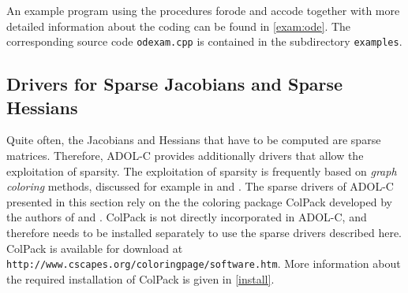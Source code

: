 \documentclass[11pt,twoside]{article}
\begin{document}
An example program using the procedures {\sf forode} and {\sf accode} together
with more detailed information about the coding can be found in
\autoref{exam:ode}. The corresponding source code 
\verb=odexam.cpp= is contained in the subdirectory
\verb=examples=.
%
%
\subsection{Drivers for Sparse Jacobians and Sparse Hessians}
\label{sparse}
%
Quite often, the Jacobians and Hessians that have to be computed are sparse
matrices. Therefore, ADOL-C provides additionally drivers that 
allow the exploitation of sparsity. The exploitation of sparsity is
frequently based on {\em graph coloring} methods, discussed 
for example in \cite{GeMaPo05} and \cite{GeTaMaPo07}. The sparse drivers of ADOL-C presented in this section
rely on the the coloring package ColPack developed by the authors of \cite{GeMaPo05} and \cite{GeTaMaPo07}.
ColPack is not directly incorporated in ADOL-C, and therefore needs to be installed
separately to use the sparse drivers described here. ColPack is available for download at
\verb=http://www.cscapes.org/coloringpage/software.htm=. More information about the required
installation of ColPack is given in \autoref{install}.
%
\end{document}
